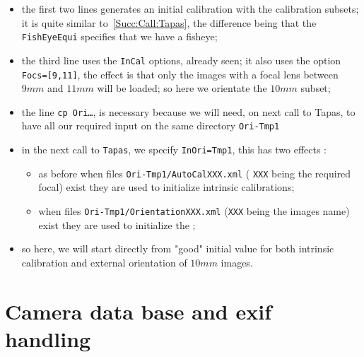 \begin{itemize}
   \item  the first two lines generates an initial calibration  with the calibration subsets;
          it is quite similar to~\ref{Succ:Call:Tapas}, the difference being that the 
          {\tt FishEyeEqui} specifies that we have a fisheye;

   \item  the third line uses the  {\tt InCal} options, already seen;  it also
          uses the option {\tt Focs=[9,11]}, the effect is   that only the images
          with a focal lens between $9mm$ and $11mm$ will be loaded; so here we orientate
          the $10mm$ subset;

   \item the line {\tt cp Ori\dots}, is necessary because we will need, on next call to Tapas,
         to have all our required input on the same directory {\tt Ori-Tmp1}

    \item in the next call to {\tt Tapas}, we specify {\tt InOri=Tmp1},  this has two effects :
         
\begin{itemize}
         \item  as before when files {\tt Ori-Tmp1/AutoCalXXX.xml} ( {\tt XXX} being the required focal) exist
                they are used to initialize intrinsic calibrations;

         \item  when files  {\tt Ori-Tmp1/OrientationXXX.xml} ({\tt XXX} being the images
                name) exist they are used to initialize the ;%
\end{itemize}
    \item  so here, we will start directly from "good" initial value for both intrinsic calibration
           and external orientation of $10mm$ images.

\end{itemize}



\section{Camera data base and exif handling}

